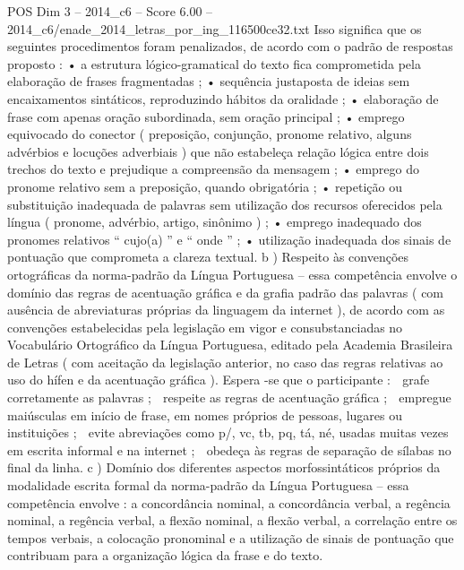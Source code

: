 \begin{textsample}{POS Dim 3 – 2014\_c6 – Score 6.00 – 2014\_c6/enade\_2014\_letras\_por\_ing\_116500ce32.txt}
Isso significa que os seguintes procedimentos foram penalizados, de acordo com o padrão de respostas proposto : • a estrutura lógico-gramatical do texto fica comprometida pela elaboração de frases fragmentadas ; • sequência justaposta de ideias sem encaixamentos sintáticos, reproduzindo hábitos da oralidade ; • elaboração de frase com apenas oração subordinada, sem oração principal ; • emprego equivocado do conector ( preposição, conjunção, pronome relativo, alguns advérbios e locuções adverbiais ) que não estabeleça relação lógica entre dois trechos do texto e prejudique a compreensão da mensagem ; • emprego do pronome relativo sem a preposição, quando obrigatória ; • repetição ou substituição inadequada de palavras sem utilização dos recursos oferecidos pela língua ( pronome, advérbio, artigo, sinônimo ) ; • emprego inadequado dos pronomes relativos “ cujo(a) ” e “ onde ” ; • utilização inadequada dos sinais de pontuação que comprometa a clareza textual. b ) Respeito às convenções ortográficas da norma-padrão da Língua Portuguesa – essa competência envolve o domínio das regras de acentuação gráfica e da grafia padrão das palavras ( com ausência de abreviaturas próprias da linguagem da internet ), de acordo com as convenções estabelecidas pela legislação em vigor e consubstanciadas no Vocabulário Ortográfico da Língua Portuguesa, editado pela Academia Brasileira de Letras ( com aceitação da legislação anterior, no caso das regras relativas ao uso do hífen e da acentuação gráfica ).
Espera -se que o participante :  grafe corretamente as palavras ;  respeite as regras de acentuação gráfica ;  empregue maiúsculas em início de frase, em nomes próprios de pessoas, lugares ou instituições ;  evite abreviações como p/, vc, tb, pq, tá, né, usadas muitas vezes em escrita informal e na internet ;  obedeça às regras de separação de sílabas no final da linha. c ) Domínio dos diferentes aspectos morfossintáticos próprios da modalidade escrita formal da norma-padrão da Língua Portuguesa – essa competência envolve : a concordância nominal, a concordância verbal, a regência nominal, a regência verbal, a flexão nominal, a flexão verbal, a correlação entre os tempos verbais, a colocação pronominal e a utilização de sinais de pontuação que contribuam para a organização lógica da frase e do texto.

\end{textsample}
